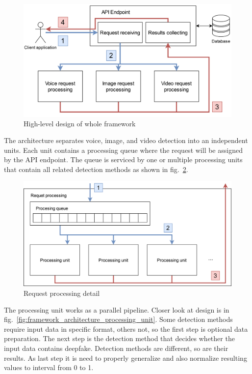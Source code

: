 \begin{figure}[H]
    \centering
    \includegraphics[width=.7\linewidth]{other-fig/framework_architecture.png}
    \caption{High-level design of whole framework}
    \label{fig:framework_architecture}
\end{figure}

The architecture separates voice, image, and video detection into an independent units. Each unit contains a processing queue where the request will be assigned by the API endpoint. The queue is serviced by one or multiple processing units that contain all related detection methods as shown in fig.~\ref{fig:framework_architecture_request_processing}.

\begin{figure}[H]
    \centering
    \includegraphics[width=.65\linewidth]{other-fig/framework_architecture_request_processing.png}
    \caption{Request processing detail}
    \label{fig:framework_architecture_request_processing}
\end{figure}

The processing unit works as a parallel pipeline. Closer look at design is in fig.~\ref{fig:framework_architecture_processing_unit}. Some detection methods require input data in specific format, others not, so the first step is optional data preparation. The next step is the detection method that decides whether the input data contains deepfake. Detection methods are different, so are their results. As last step it is need to properly generalize and also normalize resulting values to interval from 0 to 1.

